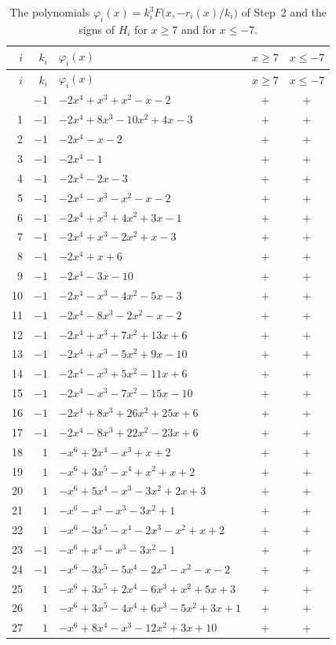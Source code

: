 \documentclass[11pt]{article}
\begin{document}
\begingroup\footnotesize
\setlength{\LTcapwidth}{\textwidth}
\begin{longtable}{@{}rrlcc@{}}
\caption{The polynomials $\varphi_i(x)=k_i^3F\bigl(x,-r_i(x)/k_i\bigr)$ of Step~2 and the signs of $H_i$ for $x\geq7$ and for $x\leq-7$.}\label{tab:phi}\\
\hline $i$ & $k_i$ & $\varphi_i(x)$ & $x\geq7$ & $x\leq-7$\\\hline\endfirsthead\hline $i$ & $k_i$ & $\varphi_i(x)$ & $x\geq7$ & $x\leq-7$\\\hline\endhead\hline\endfoot
0 & $-1$ & $-2x^{4}+x^{3}+x^{2}-x-2$ & $+$ & $+$\\
1 & $-1$ & $-2x^{4}+8x^{3}-10x^{2}+4x-3$ & $+$ & $+$\\
2 & $-1$ & $-2x^{4}-x-2$ & $+$ & $+$\\
3 & $-1$ & $-2x^{4}-1$ & $+$ & $+$\\
4 & $-1$ & $-2x^{4}-2x-3$ & $+$ & $+$\\
5 & $-1$ & $-2x^{4}-x^{3}-x^{2}-x-2$ & $+$ & $+$\\
6 & $-1$ & $-2x^{4}+x^{3}+4x^{2}+3x-1$ & $+$ & $+$\\
7 & $-1$ & $-2x^{4}+x^{3}-2x^{2}+x-3$ & $+$ & $+$\\
8 & $-1$ & $-2x^{4}+x+6$ & $+$ & $+$\\
9 & $-1$ & $-2x^{4}-3x-10$ & $+$ & $+$\\
10 & $-1$ & $-2x^{4}-x^{3}-4x^{2}-5x-3$ & $+$ & $+$\\
11 & $-1$ & $-2x^{4}-8x^{3}-2x^{2}-x-2$ & $+$ & $+$\\
12 & $-1$ & $-2x^{4}+x^{3}+7x^{2}+13x+6$ & $+$ & $+$\\
13 & $-1$ & $-2x^{4}+x^{3}-5x^{2}+9x-10$ & $+$ & $+$\\
14 & $-1$ & $-2x^{4}-x^{3}+5x^{2}-11x+6$ & $+$ & $+$\\
15 & $-1$ & $-2x^{4}-x^{3}-7x^{2}-15x-10$ & $+$ & $+$\\
16 & $-1$ & $-2x^{4}+8x^{3}+26x^{2}+25x+6$ & $+$ & $+$\\
17 & $-1$ & $-2x^{4}-8x^{3}+22x^{2}-23x+6$ & $+$ & $+$\\
18 & $1$ & $-x^{6}+2x^{4}-x^{3}+x+2$ & $+$ & $+$\\
19 & $1$ & $-x^{6}+3x^{5}-x^{4}+x^{2}+x+2$ & $+$ & $+$\\
20 & $1$ & $-x^{6}+5x^{4}-x^{3}-3x^{2}+2x+3$ & $+$ & $+$\\
21 & $1$ & $-x^{6}-x^{4}-x^{3}-3x^{2}+1$ & $+$ & $+$\\
22 & $1$ & $-x^{6}-3x^{5}-x^{4}-2x^{3}-x^{2}+x+2$ & $+$ & $+$\\
23 & $-1$ & $-x^{6}+x^{4}-x^{3}-3x^{2}-1$ & $+$ & $+$\\
24 & $-1$ & $-x^{6}-3x^{5}-5x^{4}-2x^{3}-x^{2}-x-2$ & $+$ & $+$\\
25 & $1$ & $-x^{6}+3x^{5}+2x^{4}-6x^{3}+x^{2}+5x+3$ & $+$ & $+$\\
26 & $1$ & $-x^{6}+3x^{5}-4x^{4}+6x^{3}-5x^{2}+3x+1$ & $+$ & $+$\\
27 & $1$ & $-x^{6}+8x^{4}-x^{3}-12x^{2}+3x+10$ & $+$ & $+$\\
\end{longtable}
\endgroup
\end{document}
